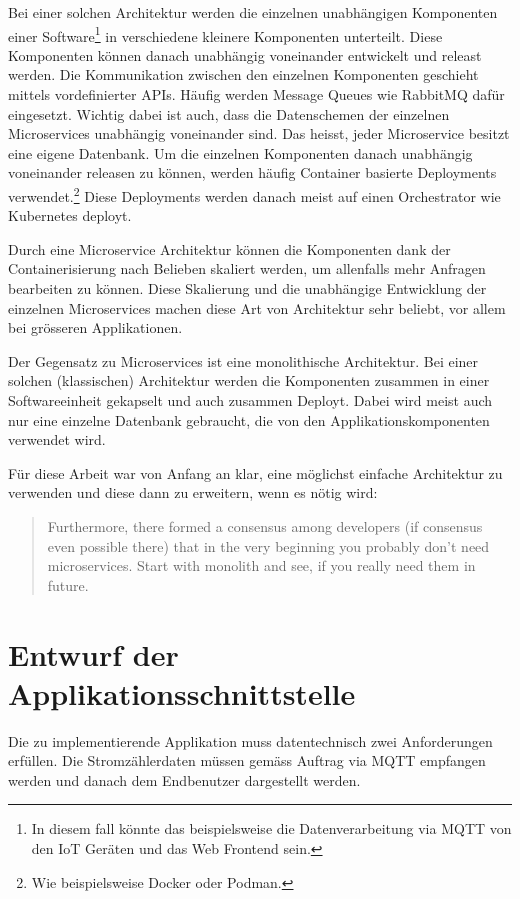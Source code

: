 Bei einer solchen Architektur werden die einzelnen unabhängigen Komponenten
einer Software\footnote{
    In diesem fall könnte das beispielsweise die Datenverarbeitung via MQTT
    von den \ac{IoT} Geräten und das Web Frontend sein.
} in verschiedene kleinere Komponenten unterteilt.
Diese Komponenten können danach unabhängig voneinander entwickelt und
releast werden.
Die Kommunikation zwischen den einzelnen Komponenten geschieht mittels
vordefinierter \ac{API}s. Häufig werden Message Queues wie RabbitMQ dafür
eingesetzt. Wichtig dabei ist auch, dass die Datenschemen der einzelnen
Microservices unabhängig voneinander sind. Das heisst, jeder Microservice
besitzt eine eigene Datenbank. \parencite{microservices}
Um die einzelnen Komponenten danach unabhängig voneinander releasen zu
können, werden häufig Container basierte Deployments verwendet.\footnote{
    Wie beispielsweise Docker oder Podman.
}
Diese Deployments werden danach meist auf einen Orchestrator wie Kubernetes
deployt.

Durch eine Microservice Architektur können die Komponenten dank der Containerisierung
nach Belieben skaliert werden, um allenfalls mehr Anfragen bearbeiten zu können.
Diese Skalierung und die unabhängige Entwicklung der einzelnen Microservices
machen diese Art von Architektur sehr beliebt, vor allem bei grösseren Applikationen.

Der Gegensatz zu Microservices ist eine monolithische Architektur. Bei einer
solchen (klassischen) Architektur werden die Komponenten zusammen in einer
Softwareeinheit gekapselt und auch zusammen Deployt.
Dabei wird meist auch nur eine einzelne Datenbank gebraucht, die von den
Applikationskomponenten verwendet wird.

Für diese Arbeit war von Anfang an klar, eine möglichst einfache
Architektur zu verwenden und diese dann zu erweitern, wenn es nötig wird:

\blockquote{
    Furthermore, there formed a consensus among developers (if consensus even possible there) that in
    the very beginning you probably don’t need microservices. Start with monolith and see,
    if you really need them in future. \cite{microservice-shared-db}
}

\section{Entwurf der Applikationsschnittstelle}
\label{konzepte:api-kommunikation}

Die zu implementierende Applikation muss datentechnisch zwei Anforderungen erfüllen.
Die Stromzählerdaten müssen gemäss Auftrag via \ac{MQTT} empfangen werden
und danach dem Endbenutzer dargestellt werden.

